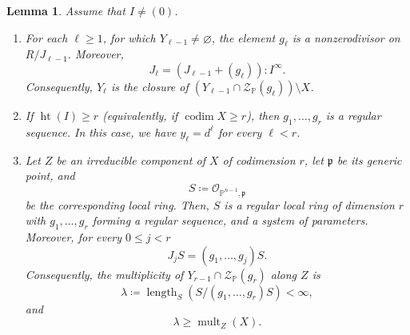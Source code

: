 \documentclass[11pt,letterpaper]{article}
\newtheorem{lemma}[theorem]{Lemma}\AddToHook{env/lemma/begin}{\crefalias{theorem}{lemma}}
\numberwithin{equation}{section}
\newcommand{\PP}{\mathbb{P}}
\newcommand{\cZ}{\mathcal{Z}}
\newcommand{\fp}{\mathfrak{p}}
\DeclareMathOperator{\length}{length}
\DeclareMathOperator{\codim}{codim}
\DeclareMathOperator{\mult}{mult}
\begin{document}
\begin{lemma}
\label{lem:master}
    Assume that $I\neq (0)$.
    \begin{enumerate}
        \item \label{it:master1}
        For each $\ell\geq 1$, for which $Y_{\ell-1}\neq\varnothing$, the element $g_\ell$ is a nonzerodivisor on $R/J_{\ell-1}$.
        Moreover, \begin{equation}
        \label{eq:saturation-eq}
        J_\ell = \left( J_{\ell-1}+(g_\ell) \right) : I^\infty.
                \end{equation}
                Consequently, $Y_\ell$ is the closure of $(Y_{\ell-1}\cap \cZ_{\PP}(g_\ell))\setminus X$.
        \item \label{it:master2}
        If $\operatorname{ht}(I)\geq r$ (equivalently, if $\codim X\geq r$), then $g_1,\dots,g_r$ is a regular sequence.
        In this case, we have $y_\ell=d^\ell$ for every $\ell< r$.
        \item \label{it:master3}
        Let $Z$ be an irreducible component of $X$ of codimension $r$, let $\fp$ be its generic point, and \[
        S \coloneqq \mathcal{O}_{\PP^{n-1},\fp}
        \] be the corresponding local ring.
        Then, $S$ is a regular local ring of dimension $r$ with $g_1,\dots,g_r$ forming a regular sequence, and a system of parameters.
        Moreover, for every $0\leq j<r$  \[
        J_j S = (g_1,\dots,g_j) S.
        \]
        Consequently, the multiplicity of $Y_{r-1}\cap\cZ_{\PP}(g_r)$ along $Z$ is  \[
        \lambda\coloneqq \length_{S}\left(S/(g_1,\dots,g_r)S\right) < \infty,
        \] and \[
        \lambda \geq \mult_Z(X).
        \]
    \end{enumerate}
\end{lemma}
\end{document}
